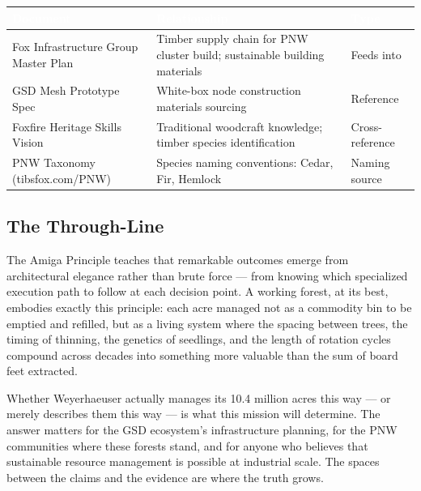 \documentclass[11pt,letterpaper]{article}
\newcommand{\stageheader}[2]{%
  \noindent\colorbox{#2}{\makebox[\textwidth][l]{%
    \textcolor{white}{\bfseries\sffamily\hspace{6pt}#1\hspace{6pt}}}}%
  \vspace{0.5em}\par%
}
\newcommand{\tableheader}[1]{\textbf{\sffamily\textcolor{white}{#1}}}
\begin{document}
\begin{center}
\begin{tabularx}{\textwidth}{L{4cm}XC{2.5cm}}
\toprule
{}
\tableheader{Document} & \tableheader{Relationship} & \tableheader{Type} \\
\midrule
Fox Infrastructure Group Master Plan & Timber supply chain for PNW cluster build; sustainable building materials & Feeds into \\
GSD Mesh Prototype Spec & White-box node construction materials sourcing & Reference \\
Foxfire Heritage Skills Vision & Traditional woodcraft knowledge; timber species identification & Cross-reference \\
PNW Taxonomy (tibsfox.com/PNW) & Species naming conventions: Cedar, Fir, Hemlock & Naming source \\
\bottomrule
\end{tabularx}
\end{center}

\subsection{The Through-Line}

The Amiga Principle teaches that remarkable outcomes emerge from architectural elegance rather than brute force --- from knowing which specialized execution path to follow at each decision point. A working forest, at its best, embodies exactly this principle: each acre managed not as a commodity bin to be emptied and refilled, but as a living system where the spacing between trees, the timing of thinning, the genetics of seedlings, and the length of rotation cycles compound across decades into something more valuable than the sum of board feet extracted.

Whether Weyerhaeuser actually manages its 10.4 million acres this way --- or merely describes them this way --- is what this mission will determine. The answer matters for the GSD ecosystem's infrastructure planning, for the PNW communities where these forests stand, and for anyone who believes that sustainable resource management is possible at industrial scale. The spaces between the claims and the evidence are where the truth grows.

\newpage

\stageheader{STAGE 2 --- RESEARCH REFERENCE}{secondary}
\end{document}
